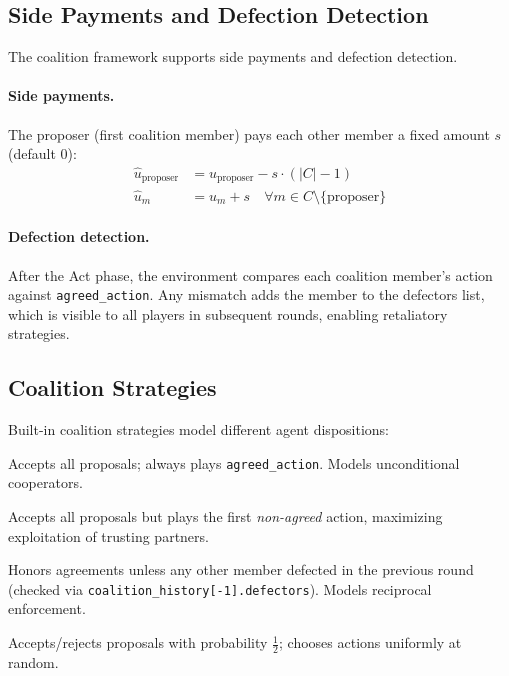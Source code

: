 \subsection{Side Payments and Defection Detection}
\label{sec:side-payments}

The coalition framework supports side payments and defection detection.

\paragraph{Side payments.} The proposer (first coalition member) pays each
other member a fixed amount $s$ (default $0$):
\begin{align}
\hat{u}_{\text{proposer}} &= u_{\text{proposer}} - s \cdot (|C| - 1) \\
\hat{u}_{m} &= u_m + s \quad \forall m \in C \setminus \{\text{proposer}\}
\end{align}

\paragraph{Defection detection.} After the Act phase, the environment
compares each coalition member's action against \texttt{agreed\_action}.
Any mismatch adds the member to the defectors list, which is visible to
all players in subsequent rounds, enabling retaliatory strategies.

\subsection{Coalition Strategies}
\label{sec:coalition-strategies}

Built-in coalition strategies model different agent dispositions:

\begin{description}[nosep]
    \item[Loyal.] Accepts all proposals; always plays \texttt{agreed\_action}.
        Models unconditional cooperators.
    \item[Betrayer.] Accepts all proposals but plays the first \emph{non-agreed}
        action, maximizing exploitation of trusting partners.
    \item[Conditional.] Honors agreements unless any other member defected
        in the previous round (checked via \texttt{coalition\_history[-1].defectors}).
        Models reciprocal enforcement.
    \item[Random.] Accepts/rejects proposals with probability $\frac{1}{2}$;
        chooses actions uniformly at random.
\end{description}


